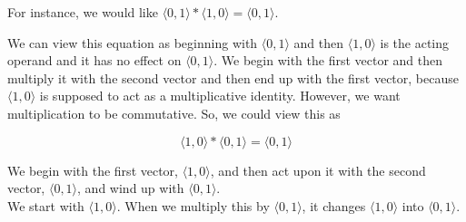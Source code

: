 \documentclass{ximera}
\begin{document}
For instance, we would like $\langle 0, 1 \rangle * \langle 1, 0 \rangle    = \langle 0, 1 \rangle $.

We can view this equation as beginning with $\langle 0, 1 \rangle$ and then $\langle 1, 0 \rangle$ is the acting operand and it has no effect on $\langle 0, 1 \rangle$.  We begin with the first vector and then multiply it with the second vector and then end up with the first vector, because $\langle 1, 0 \rangle$ is supposed to act as a multiplicative identity. However, we want multiplication to be commutative.  So, we could view this as 

\[    \langle 1, 0 \rangle * \langle 0, 1 \rangle    = \langle 0, 1 \rangle            \]


We begin with the first vector, $\langle 1, 0 \rangle$, and then act upon it with the second vector, $\langle 0, 1 \rangle$, and wind up with $\langle 0, 1 \rangle$. \\


We start with $\langle 1, 0 \rangle$.  When we multiply this by $\langle 0, 1 \rangle$, it changes $\langle 1, 0 \rangle$ into $\langle 0, 1 \rangle$.









\begin{image}
\end{image}
\end{document}
